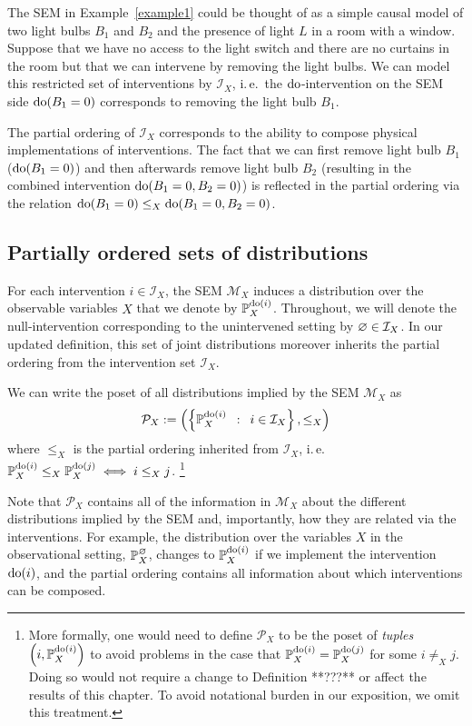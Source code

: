 The SEM in Example~\ref{example1} could be thought of as a simple causal model of two light bulbs $B_1$ and $B_2$ and the presence of light $L$ in a room with a window.
Suppose that we have no access to the light switch and there are no curtains in the room but that we can intervene by removing the light bulbs.
We can model this restricted set of interventions by $\mathcal{I}_X$, i.\,e.\ the $\operatorname{do}$-intervention on the SEM side ${\operatorname{do}(B_1=0)}$  corresponds to removing the light bulb $B_1$.

The partial ordering of $\mathcal{I}_X$ corresponds to the ability to compose physical implementations of interventions. The fact that we can first remove light bulb $B_1$ (${\operatorname{do}(B_1=0)}$) and then afterwards remove light bulb $B_2$ (resulting in the combined intervention ${\operatorname{do}(B_1=0, B_2=0)}$)  is reflected in the partial ordering via the relation ${\operatorname{do}(B_1=0) \leq_X \operatorname{do}(B_1=0,B_2=0)}$.

\subsection{Partially ordered sets of distributions}

For each intervention $i \in \mathcal{I}_X$, the SEM $\mathcal{M}_X$ induces a distribution over the observable variables $X$ that we denote by $\mathbb{P}_X^{\operatorname{do}(i)}$.
Throughout, we will denote the null-intervention corresponding to the unintervened setting by $\varnothing\in \mathcal{I}_X$.
In our updated definition, this set of joint distributions moreover inherits the partial ordering from the intervention set $\mathcal{I}_X$. 

We can write the poset of all distributions implied by the SEM $\mathcal{M}_X$ as
\[\mathcal{P}_X := \left( \left\{ \mathbb{P}_X^{\operatorname{do}(i)} \enspace : \enspace i \in \mathcal{I}_X \right\}, \leq_X \right) \]
where $\leq_X$ is the partial ordering inherited from $\mathcal{I}_X$, i.\,e.\ ${\mathbb{P}_X^{\operatorname{do}(i)} \leq_X \mathbb{P}_X^{\operatorname{do}(j)} \iff i \leq_X j}$.%
\footnote{More formally, one would need to define $\mathcal{P}_X$ to be the poset of \emph{tuples} $\left(i, \mathbb{P}_X^{\operatorname{do}(i)}\right)$ to avoid problems in the case that $\mathbb{P}_X^{\operatorname{do}(i)} = \mathbb{P}_X^{\operatorname{do}(j)}$ for some $i\not=_X j$. Doing so would not require a change to Definition **???** or affect the results of this chapter. To avoid notational burden in our exposition, we omit this treatment.}

Note that $\mathcal{P}_X$ contains all of the information in $\mathcal{M}_X$ about the different distributions implied by the SEM and, importantly, how they are related via the interventions.
For example, the distribution over the variables $X$ in the observational setting, $\mathbb{P}_X^\varnothing$, changes to $\mathbb{P}_X^{\operatorname{do}(i)}$ if we implement the intervention ${\operatorname{do}(i)}$, and the partial ordering contains all information about which interventions can be composed.


